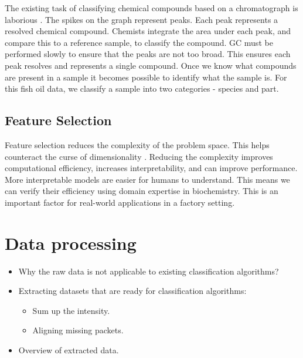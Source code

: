 \documentclass[runningheads]{llncs}
\begin{document}
The existing task of classifying chemical compounds based on a chromatograph is laborious \cite{eder1995gas,restek2018high}.
The spikes on the graph represent peaks.
Each peak represents a resolved chemical compound.
Chemists integrate the area under each peak, and compare this to a reference sample, to classify the compound.
GC must be performed slowly to ensure that the peaks are not too broad.
This ensures each peak resolves and represents a single compound.
Once we know what compounds are present in a sample it becomes possible to identify what the sample is.
For this fish oil data, we classify a sample into two categories - species and part. 

\subsection{Feature Selection}
\label{sec:background-feature-selection}


Feature selection reduces the complexity of the problem space.
This helps counteract the curse of dimensionality \cite{koppen2000curse}.
Reducing the complexity improves computational efficiency, increases interpretability, and can improve performance.
More interpretable models are easier for humans to understand.
This means we can verify their efficiency using domain expertise in biochemistry.
This is an important factor for real-world applications in a factory setting.

\section{Data processing}


\begin{itemize}
  \item Why the raw data is not applicable to existing classification algorithms?
  \item Extracting datasets that are ready for classification algorithms:
        \begin{itemize}
          \item Sum up the intensity.
          \item Aligning missing packets.
        \end{itemize}
  \item Overview of extracted data.
\end{itemize}
\end{document}
